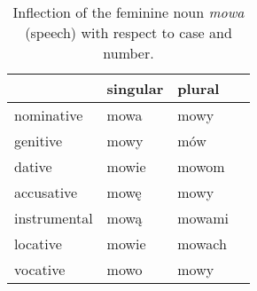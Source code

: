 \begin{table}[h!]
  \begin{center}
    \caption{Inflection of the feminine noun \textit{mowa} (speech) with respect to case and number.}
    \label{table:declination}
    \begin{tabular*}{.6\linewidth}{@{\extracolsep{\fill}}llll}
      & singular & plural \\
      \midrule
      nominative & mowa & mowy \\
      genitive & mowy & mów \\
      dative & mowie & mowom \\
      accusative & mowę & mowy \\
      instrumental & mową & mowami \\
      locative & mowie & mowach \\
      vocative & mowo & mowy \\
    \end{tabular*}
  \end{center}
\end{table}

